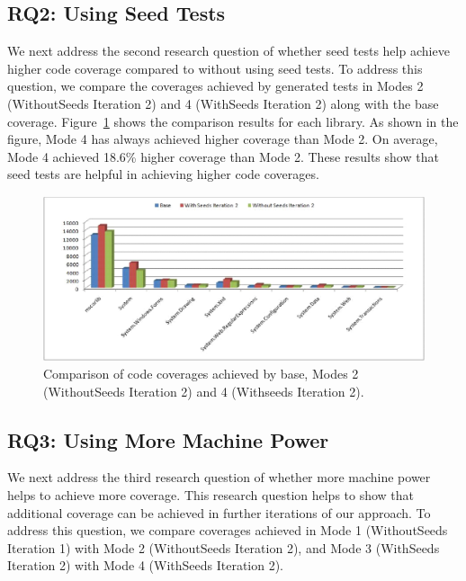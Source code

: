 \subsection{RQ2: Using Seed Tests}

We next address the second research question of whether seed tests help achieve 
higher code coverage compared to without using seed tests. To address this question,
we compare the coverages achieved by generated tests in Modes 2 (WithoutSeeds Iteration 2) and 4 (WithSeeds
Iteration 2) along with the base coverage. Figure~\ref{fig:rq3} shows the 
comparison results for each library. As shown in the figure, Mode 4 has
always achieved higher coverage than Mode 2. On average, Mode 4 achieved 
18.6\% higher coverage than Mode 2. These results show that seed tests are 
helpful in achieving higher code coverages.

\begin{figure}[t]
\centering
\includegraphics[scale=0.70,clip]{figs/RQ3_1.eps}\vspace*{-1ex}
\caption{Comparison of code coverages achieved by base, Modes 2 (WithoutSeeds Iteration 2) and 4 (Withseeds Iteration 2).} \label{fig:rq3}
\end{figure}

\subsection{RQ3: Using More Machine Power}

We next address the third research question of whether more machine power helps to
achieve more coverage. This research question helps to show that additional
coverage can be achieved in further iterations of our approach.
To address this question, we compare coverages achieved in Mode 1 (WithoutSeeds Iteration 1) with
Mode 2 (WithoutSeeds Iteration 2), and Mode 3 (WithSeeds Iteration 2) with
Mode 4 (WithSeeds Iteration 2). 

